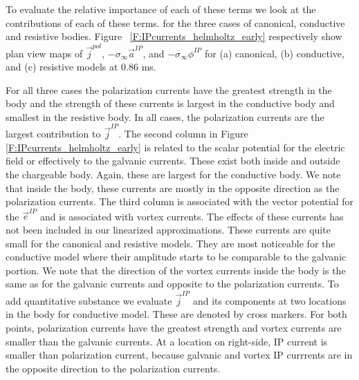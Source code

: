 \documentclass[extra,mreferee]{gji}
\newcommand{\siginf}{\sigma_\infty}
\renewcommand {\j}  { {\vec j} }
\newcommand {\e}  { {\vec e} }
\begin{document}
To evaluate the relative importance of each of these terms we look at the contributions of each of these terms.  for the three cases of canonical, conductive and resistive bodies. 
Figure ~\ref{F:IPcurrents_helmholtz_early} respectively show plan view maps of $\j^{pol}$, $-\siginf \vec{a}^{IP}$, and $-\siginf \phi^{IP}$ for (a) canonical, (b) conductive, and (c) resistive models at 0.86 ms. 

For all three cases the polarization currents have the greatest strength in the body and the strength of these currents is largest in the conductive body and smallest in the resistive body.
In all cases, the polarization currents are the largest contribution to $\j^{IP}$. 
The second column in Figure \ref{F:IPcurrents_helmholtz_early} is related to the scalar potential for the electric field or effectively to the galvanic currents. 
These exist both inside and outside the chargeable body.
Again, these are largest for the conductive body. 
We note that inside the body, these currents are mostly in the opposite direction as the polarization currents. 
The third column is associated with the vector potential for the $\e^{IP}$ and is associated with vortex currents. 
The effects of these currents has not been included in our linearized approximations. These currents are quite small for the canonical and resistive models. They are most noticeable for the conductive model where their amplitude starts to be comparable to the galvanic portion. We note that the direction of the vortex currents inside the body is the same as for the galvanic currents and opposite to the polarization currents. 
To add quantitative substance we evaluate $\j^{IP} $ and its components at two locations in the body for conductive model. These are denoted by cross markers. For both points, polarization currents have the greatest strength and vortex currents are smaller than the galvanic currents. 
At a location on right-side, IP current is smaller than polarization current, because galvanic and vortex IP currrents are in the opposite direction to the polarization currents. 
\end{document}
